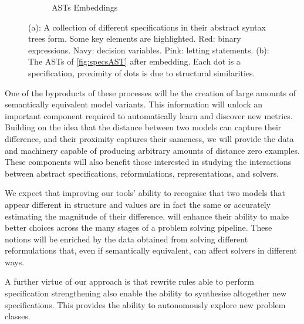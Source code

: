 \documentclass[a4paper,UKenglish,cleveref, autoref,pdfa]{lipics-v2021}
\begin{document}
\begin{figure}
\begin{subfigure}{.5\textwidth}
    \caption{ASTs Embeddings}
    \label{fig:embedding}
\end{subfigure}
\caption{(a): A collection of different specifications in their abstract syntax trees form. Some key elements are highlighted. Red: binary expressions. Navy: decision variables. Pink: letting statements. (b): The ASTs of \cref{fig:specsAST} after embedding. Each dot is a specification, proximity of dots is due to structural similarities.}
\label{fig:test}
\end{figure}


One of the byproducts of these processes will be the creation of large amounts of semantically equivalent model variants.
This information will unlock an important component required to automatically learn and discover new metrics. Building on the idea that the distance between two models can capture their difference, and their proximity captures their sameness, we will provide the data and machinery capable of producing arbitrary amounts of distance zero examples. These components will also benefit those interested in studying the interactions between abstract specifications, reformulations, representations, and solvers.

We expect that improving our tools' ability to recognise that two models that appear different in structure and values are in fact the same or accurately estimating the magnitude of their difference, will enhance their ability to make better choices across the many stages of a problem solving pipeline.
These notions will be enriched by the data obtained from solving different reformulations that, even if semantically equivalent, can affect solvers in different ways.

A further virtue of our approach is that rewrite rules able to perform specification strengthening also enable the ability to synthesise altogether new specifications. This provides the ability to autonomously explore new problem classes.



\end{document}
